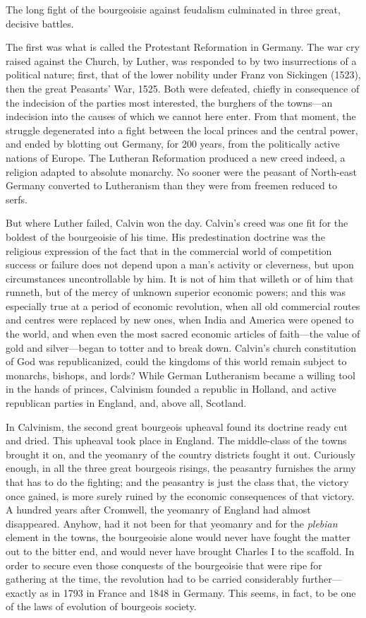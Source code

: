 The long fight of the bourgeoisie against feudalism culminated in three great,
decisive battles.

The first was what is called the Protestant Reformation in Germany. The war cry
raised against the Church, by Luther, was responded to by two insurrections of a
political nature; first, that of the lower nobility under Franz von Sickingen
(1523), then the great Peasants' War, 1525. Both were defeated, chiefly in
consequence of the indecision of the parties most interested, the burghers of
the towns---an indecision into the causes of which we cannot here enter. From
that moment, the struggle degenerated into a fight between the local princes and
the central power, and ended by blotting out Germany, for 200 years, from the
politically active nations of Europe. The Lutheran Reformation produced a new
creed indeed, a religion adapted to absolute monarchy. No sooner were the
peasant of North-east Germany converted to Lutheranism than they were from
freemen reduced to serfs. 

But where Luther failed, Calvin won the day. Calvin's creed was one fit for the
boldest of the bourgeoisie of his time. His predestination doctrine was the
religious expression of the fact that in the commercial world of competition
success or failure does not depend upon a man's activity or cleverness, but upon
circumstances uncontrollable by him. It is not of him that willeth or of him
that runneth, but of the mercy of unknown superior economic powers; and this was
especially true at a period of economic revolution, when all old commercial
routes and centres were replaced by new ones, when India and America were opened
to the world, and when even the most sacred economic articles of faith---the
value of gold and silver---began to totter and to break down. Calvin's church
constitution of God was republicanized, could the kingdoms of this world remain
subject to monarchs, bishops, and lords? While German Lutheranism became a
willing tool in the hands of princes, Calvinism founded a republic in Holland,
and active republican parties in England, and, above all, Scotland.

In Calvinism, the second great bourgeois upheaval found its doctrine ready cut
and dried. This upheaval took place in England. The middle-class of the towns
brought it on, and the yeomanry of the country districts fought it out.
Curiously enough, in all the three great bourgeois risings, the peasantry
furnishes the army that has to do the fighting; and the peasantry is just the
class that, the victory once gained, is more surely ruined by the economic
consequences of that victory. A hundred years after Cromwell, the yeomanry of
England had almost disappeared. Anyhow, had it not been for that yeomanry and
for the \emph{plebian} element in the towns, the bourgeoisie alone would never
have fought the matter out to the bitter end, and would never have brought
Charles I to the scaffold. In order to secure even those conquests of the
bourgeoisie that were ripe for gathering at the time, the revolution had to be
carried considerably further---exactly as in 1793 in France and 1848 in Germany.
This seems, in fact, to be one of the laws of evolution of bourgeois society.

